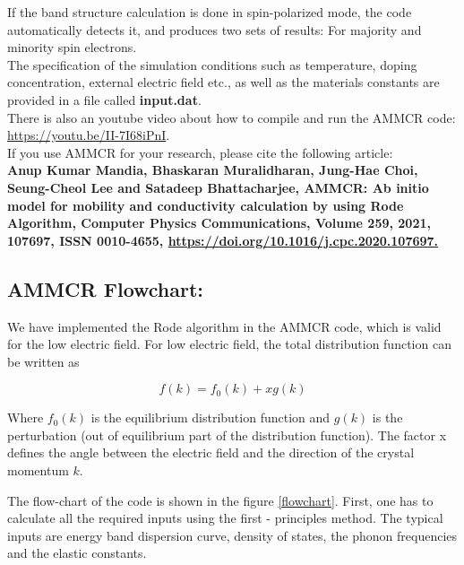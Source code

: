 \documentclass[12pt]{article}
\begin{document}
If the band structure calculation is done in spin-polarized mode, the code automatically detects it, and produces two sets of results: For majority and minority spin electrons. \\

The specification of the simulation conditions such as temperature, doping concentration, external electric field etc., as well as the materials constants are provided in a file called \textbf{input.dat}. \\

There is also an youtube video about how to compile and run the AMMCR code: \\ \href{https://youtu.be/II-7I68iPnI}{https://youtu.be/II-7I68iPnI}. \\ 

If you use AMMCR for your research, please cite the following article: \\
\textbf{Anup Kumar Mandia, Bhaskaran Muralidharan, Jung-Hae Choi, Seung-Cheol Lee and Satadeep Bhattacharjee, AMMCR: Ab initio model for mobility and conductivity calculation by using Rode Algorithm, Computer Physics Communications, Volume 259, 2021, 107697, ISSN 0010-4655, \href{https://doi.org/10.1016/j.cpc.2020.107697}{ https://doi.org/10.1016/j.cpc.2020.107697.}} \\ 

\subsection{AMMCR Flowchart:}

We have implemented the Rode algorithm in the AMMCR code, which is valid for the low electric field. For low electric field, the total distribution function can be written as

\begin{equation} \label{equilibrium_distribution}
    f(k) = f_0(k) + x g(k)
\end{equation}

Where $f_0(k)$ is the equilibrium distribution function and $g(k)$ is the perturbation (out of equilibrium part of the distribution function). The factor x defines the angle between the electric field and the direction of the crystal momentum $k$.

The flow-chart of the code is shown in the figure \ref{flowchart}. First, one has to calculate all the required inputs using the first - principles method. The typical inputs are energy band dispersion curve, density of states, the phonon frequencies and the elastic constants.
\end{document}
